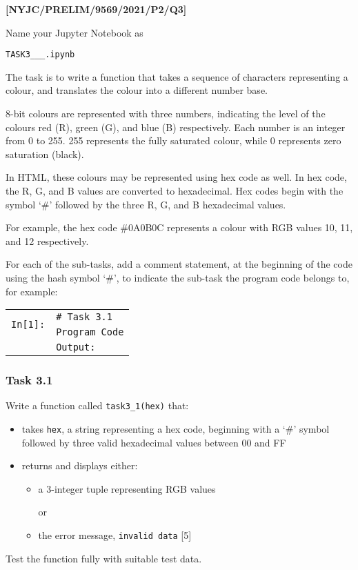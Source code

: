 \item \textbf{{[}NYJC/PRELIM/9569/2021/P2/Q3{]} }

Name your Jupyter Notebook as 

\texttt{TASK3\_<your name>\_<centre number>\_<index number>.ipynb }

The task is to write a function that takes a sequence of characters
representing a colour, and translates the colour into a different
number base. 

8-bit colours are represented with three numbers, indicating the level
of the colours red (R), green (G), and blue (B) respectively. Each
number is an integer from 0 to 255. 255 represents the fully saturated
colour, while 0 represents zero saturation (black).

In HTML, these colours may be represented using hex code as well.
In hex code, the R, G, and B values are converted to hexadecimal.
Hex codes begin with the symbol \textquoteleft \#\textquoteright{}
followed by the three R, G, and B hexadecimal values. 

For example, the hex code \#0A0B0C represents a colour with RGB values
10, 11, and 12 respectively. 

For each of the sub-tasks, add a comment statement, at the beginning
of the code using the hash symbol \textquoteleft \#\textquoteright ,
to indicate the sub-task the program code belongs to, for example: 
\noindent \begin{center}
\begin{tabular}{c|l|}
\cline{2-2} 
\multirow{2}{*}{\texttt{In{[}1{]}:}} & \texttt{\# Task 3.1}\tabularnewline
 & \texttt{Program Code}\tabularnewline
\cline{2-2} 
\multicolumn{1}{c}{} & \multicolumn{1}{l}{\texttt{Output:}}\tabularnewline
\end{tabular}
\par\end{center}

\subsubsection*{Task 3.1 }

Write a function called \texttt{task3\_1(hex)} that: 
\begin{itemize}
\item takes \texttt{hex}, a string representing a hex code, beginning with
a \textquoteleft \#\textquoteright{} symbol followed by three valid
hexadecimal values between 00 and FF 
\item returns and displays either: 
\begin{itemize}
\item a 3-integer tuple representing RGB values 

or 
\item the error message, \textquotedbl\texttt{invalid data}\textquotedbl{}
\hfill{}{[}5{]}
\end{itemize}
\end{itemize}
Test the function fully with suitable test data. 


